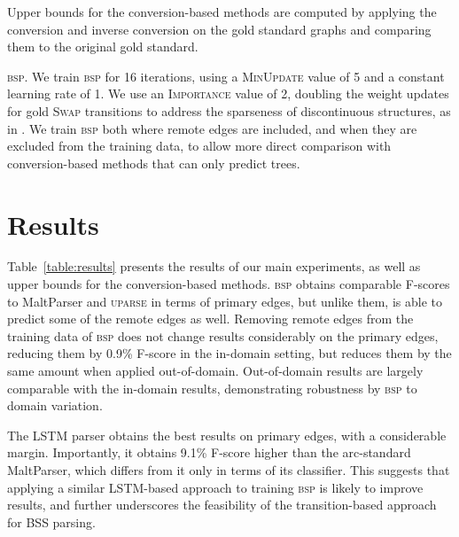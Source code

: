 \documentclass[11pt]{article}
\makeatletter
\newcommand{\tabref}[1]{Table~\ref{#1}}
\renewcommand{\paragraph}{
  \@startsection{paragraph}{4}
  {\z@}{.5ex \@plus .5ex \@minus .2ex}{-1em}
  {\normalfont\normalsize\bfseries}
}
\makeatother
\begin{document}


Upper bounds for the conversion-based methods are computed by applying
the conversion and inverse conversion on the gold standard
graphs and comparing them to the original gold standard.

\paragraph{\textsc{bsp}.}
We train \textsc{bsp} for 16 iterations, using a \textsc{MinUpdate} value of 5 and a constant learning rate of 1.
We use an \textsc{Importance} value of 2, doubling the weight updates
for gold \textsc{Swap} transitions to address the sparseness
of discontinuous structures, as in \cite{maier2015discontinuous}.
We train \textsc{bsp} both where remote edges
are included, and when they are excluded from the training data, to allow
more direct comparison with conversion-based methods that can only
predict trees.

\section{Results}\label{sec:results}

\tabref{table:results} presents the results of our main experiments, as well as
upper bounds for the conversion-based methods.
\textsc{bsp} obtains comparable F-scores to MaltParser and \textsc{uparse}
in terms of primary edges, but unlike them, is able to predict some
of the remote edges as well. 
Removing remote edges from the training data of \textsc{bsp} does not
change results considerably on the primary edges,
reducing them by 0.9\% F-score in the in-domain setting, but reduces
them by the same amount when applied out-of-domain. 
Out-of-domain results are largely comparable with the in-domain
results, demonstrating robustness by \textsc{bsp}
to domain variation.

The LSTM parser obtains the best results on primary edges,
with a considerable margin. Importantly, it obtains 9.1\%
F-score higher than the arc-standard MaltParser, which
differs from it only in terms of its classifier.
This suggests that applying a similar LSTM-based approach to
training \textsc{bsp} is likely to improve results,
and further underscores the feasibility of the transition-based
approach for BSS parsing. 
\end{document}
